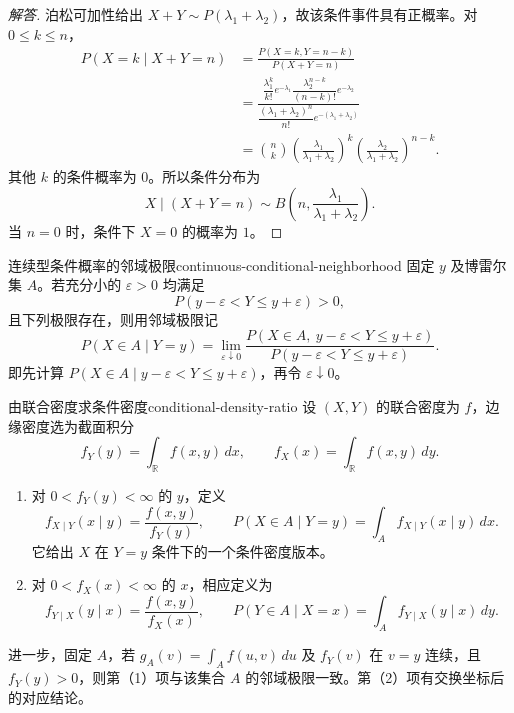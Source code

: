 \begin{proof}[解答]
泊松可加性给出 $X+Y\sim P(\lambda_1+\lambda_2)$，故该条件事件具有正概率。对 $0\leq k\leq n$，
\begin{align*}
P(X=k\mid X+Y=n)
&=\frac{P(X=k,Y=n-k)}{P(X+Y=n)}\\
&=\frac{\dfrac{\lambda_1^k}{k!}e^{-\lambda_1}
 \dfrac{\lambda_2^{n-k}}{(n-k)!}e^{-\lambda_2}}
 {\dfrac{(\lambda_1+\lambda_2)^n}{n!}e^{-(\lambda_1+\lambda_2)}}\\
&=\binom nk\left(\frac{\lambda_1}{\lambda_1+\lambda_2}\right)^k
 \left(\frac{\lambda_2}{\lambda_1+\lambda_2}\right)^{n-k}.
\end{align*}
其他 $k$ 的条件概率为 $0$。所以条件分布为
\[
X\mid(X+Y=n)\sim B\left(n,\frac{\lambda_1}{\lambda_1+\lambda_2}\right).
\]
当 $n=0$ 时，条件下 $X=0$ 的概率为 $1$。
\end{proof}

\begin{mydefinition}{连续型条件概率的邻域极限}{continuous-conditional-neighborhood}
固定 $y$ 及博雷尔集 $A$。若充分小的 $\varepsilon>0$ 均满足
\[
P(y-\varepsilon<Y\leq y+\varepsilon)>0,
\]
且下列极限存在，则用邻域极限记
\[
P(X\in A\mid Y=y)
=\lim_{\varepsilon\downarrow0}
\frac{P(X\in A,\ y-\varepsilon<Y\leq y+\varepsilon)}
 {P(y-\varepsilon<Y\leq y+\varepsilon)}.
\]
即先计算 $P(X\in A\mid y-\varepsilon<Y\leq y+\varepsilon)$，再令 $\varepsilon\downarrow0$。
\end{mydefinition}

\begin{mytheorem}{由联合密度求条件密度}{conditional-density-ratio}
设 $(X,Y)$ 的联合密度为 $f$，边缘密度选为截面积分
\[
f_Y(y)=\int_{\mathbb R}f(x,y)\,dx,\qquad
f_X(x)=\int_{\mathbb R}f(x,y)\,dy.
\]
\begin{enumerate}
\item 对 $0<f_Y(y)<\infty$ 的 $y$，定义
\[
f_{X\mid Y}(x\mid y)=\frac{f(x,y)}{f_Y(y)},\qquad
P(X\in A\mid Y=y)=\int_Af_{X\mid Y}(x\mid y)\,dx.
\]
它给出 $X$ 在 $Y=y$ 条件下的一个条件密度版本。
\item 对 $0<f_X(x)<\infty$ 的 $x$，相应定义为
\[
f_{Y\mid X}(y\mid x)=\frac{f(x,y)}{f_X(x)},\qquad
P(Y\in A\mid X=x)=\int_Af_{Y\mid X}(y\mid x)\,dy.
\]
\end{enumerate}
进一步，固定 $A$，若 $g_A(v)=\int_Af(u,v)\,du$ 及 $f_Y(v)$ 在 $v=y$ 连续，且 $f_Y(y)>0$，则第（1）项与该集合 $A$ 的邻域极限一致。第（2）项有交换坐标后的对应结论。
\end{mytheorem}

